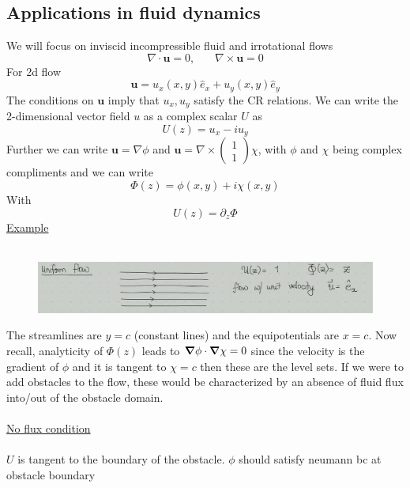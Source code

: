 \documentclass[a4paper,12pt]{article}
\begin{document}
\subsection{Applications in fluid dynamics}
We will focus on inviscid incompressible fluid and irrotational flows
\begin{equation}
\nabla\cdot \bm u=0,~~~~~~~~\nabla\times \bm u =0
\end{equation}
For 2d flow
\begin{equation}
\bm u=u_x(x,y)\hat e_x+u_y(x,y)\hat e_y
\end{equation}
The conditions on $\bm u$ imply that $u_x,u_y$ satisfy the CR relations. We can write the 2-dimensional vector field $u$ as a complex scalar $U$ as 
\begin{equation}
U(z)=u_x-iu_y
\end{equation}
Further we can write $\bm u=\nabla \phi$ and $\bm u=\nabla \times \begin{pmatrix}
1\\
1
\end{pmatrix}\chi$, with $\phi$ and $\chi$ being complex compliments and we can write
\begin{equation}
\Phi(z)=\phi(x,y)+i\chi(x,y)
\end{equation}
With
\begin{equation}
U(z)=\partial_z\Phi
\end{equation}
\underline{Example}\\\
\begin{figure}[H]
	\centering
	\includegraphics[width=0.8\linewidth]{8}
	\caption{}
	\label{fig:4}
\end{figure}
The streamlines are $y=c$ (constant lines) and the equipotentials are $x=c$. Now recall, analyticity of $\Phi(z)$ leads to $\grad \phi\cdot\grad \chi=0 $ since the velocity is the gradient of $\phi$ and it is tangent to $\chi=c$ then these are the level sets. If we were to add obstacles to the flow, these would be characterized by an absence of fluid flux into/out of the obstacle domain. 
\\\\
\underline{No flux condition}\\\\
$U$ is tangent to the boundary of the obstacle. $\phi$ should satisfy neumann bc at obstacle boundary
\end{document}
